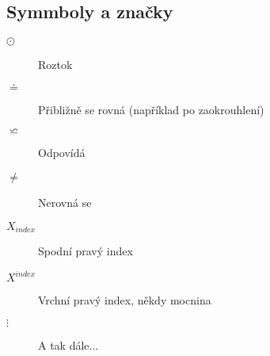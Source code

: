 \subsection{Symmboly a značky}

\begin{description}
    \item[$\odot $] Roztok
    \item[$\doteq $] Přibližně se rovná (například po zaokrouhlení)
    \item[$\backsimeq $] Odpovídá
    \item[$\neq $] Nerovná se 
    \item[$X_{index}$] Spodní pravý index
    \item[$X^{index}$] Vrchní pravý index, někdy mocnina
    \item[$\vdots $] A tak dále... 
\end{description}